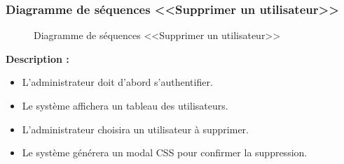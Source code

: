 \documentclass[12pt]{report}
\begin{document}
\newpage

\subsubsection{Diagramme de séquences <<Supprimer un utilisateur>>}

\begin{figure}[h]
\centering
    \centerline{}
    \caption{Diagramme de séquences <<Supprimer un utilisateur>>}
\end{figure}

\vspace{0.3in}

\textbf{Description :}

\begin{itemize}
    \item L'administrateur doit d'abord s'authentifier.
    \item Le système affichera un tableau des utilisateurs.
    \item L'administrateur choisira un utilisateur à supprimer.
    \item Le système générera un modal CSS pour confirmer la suppression.
\end{itemize}
\end{document}
